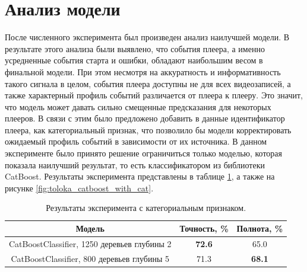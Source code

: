 \section{Анализ модели}

После численного эксперимента был произведен анализ наилучшей модели. В результате этого анализа были выявлено, что события плеера, а именно усредненные события старта и ошибки, обладают наибольшим весом в финальной модели. При этом несмотря на аккуратность и информативность такого сигнала в целом, события плеера доступны не для всех видеозаписей, а также характерный профиль событий различается от плеера к плееру. Это значит, что модель может давать сильно смещенные предсказания для некоторых плееров. В связи с этим было предложено добавить в данные идентификатор плеера, как категориальный признак, что позволило бы модели корректировать ожидаемый профиль событий в зависимости от их источника. В данном эксперименте было принято решение ограничиться только моделью, которая показала наилучший результат, то есть классификатором из библиотеки CatBoost. Результаты эксперимента представлены в таблице \ref{tab:toloka_catboost_with_cat}, а также на рисунке \ref{fig:toloka_catboost_with_cat}.

\begin{table}[h]
    \centering
    \begin{tabular}{|c|c|c|}
        \hline
        Модель & Точность, \% & Полнота, \% \\
        \hline
        CatBoostClassifier, 1250 деревьев глубины 2 & \textbf{72.6} & 65.0 \\
        \hline
        CatBoostClassifier, 800 деревьев глубины 5 & 71.3 & \textbf{68.1} \\
        \hline
    \end{tabular}
    \caption{Результаты эксперимента с категориальным признаком.}
    \label{tab:toloka_catboost_with_cat}
\end{table}

